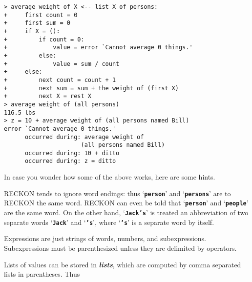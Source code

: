 \documentclass[12pt]{article}
\newcommand{\TT}[1]{{\tt \bfseries #1}}
\newcommand{\skey}[2]{{\bf \em #1#2}\index{#1}}
\newenvironment{indpar}[1][0.3in]%
	{\begin{list}{}%
		     {\setlength{\itemsep}{0in}%
		      \setlength{\topsep}{0in}%
		      \setlength{\parsep}{1ex}%
		      \setlength{\labelwidth}{#1}%
		      \setlength{\leftmargin}{#1}%
		      \addtolength{\leftmargin}{\labelsep}}%
	 \item}%
	{\end{list}}
\begin{document}
\begin{indpar}
\verb|> average weight of X <-- list X of persons:| \\
\verb|+     first count = 0| \\
\verb|+     first sum = 0| \\
\verb|+     if X = ():| \\
\verb|+         if count = 0:| \\
\verb|+             value = error `Cannot average 0 things.'| \\
\verb|+         else:| \\
\verb|+             value = sum / count| \\
\verb|+     else:| \\
\verb|+         next count = count + 1| \\
\verb|+         next sum = sum + the weight of (first X)| \\
\verb|+         next X = rest X| \\
\verb|> average weight of (all persons)| \\
\verb|116.5 lbs| \\
\verb|> z = 10 + average weight of (all persons named Bill)| \\
\verb|error `Cannot average 0 things.'| \\
\verb|      occurred during: average weight of| \\
\verb|                      (all persons named Bill)| \\
\verb|      occurred during: 10 + ditto| \\
\verb|      occurred during: z = ditto|
\end{indpar}

In case you wonder how some of the above works, here are some hints.

RECKON tends to ignore word endings: thus `\TT{person}' and
`\TT{persons}' are to RECKON the same word.
RECKON can even be told that `\TT{person}'
and `\TT{people}' are the same word.
On the other hand, `\TT{Jack's}' is treated an abbreviation
of two separate words `\TT{Jack}' and `\TT{'s}', where `\TT{'s}' is
a separate word by itself.

Expressions are just strings of words, numbers, and subexpressions.
Subexpressions must be parenthesized unless they
are delimited by operators.

Lists of values can be stored in \skey{list}s, which are computed by comma
separated lists in parentheses.  Thus
\end{document}
